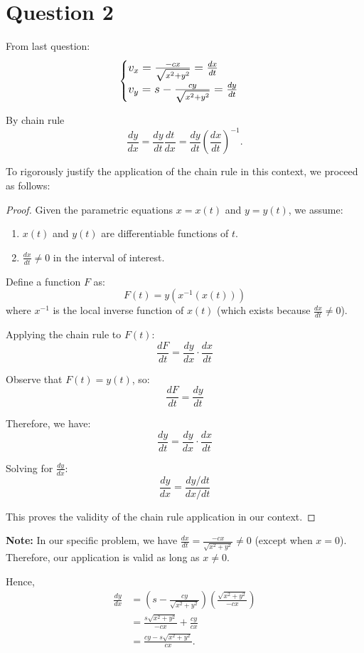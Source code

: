\documentclass[12pt,a4paper]{article}
\begin{document}
\section*{Question 2}
\begin{solution}
From last question:
\begin{equation}
    \large
    \begin{cases}
        {v}_x = \frac{-c x}{\sqrt{x^2+y^2}} = \frac{dx}{dt}\\
        {v}_y =  s-\frac{c y}{\sqrt{x^2+y^2}} = \frac{dy}{dt}
    \end{cases}
\end{equation}

By chain rule
\[
\frac{dy}{dx} = \frac{dy}{dt} \frac{dt}{dx} = \frac{dy}{dt} \left(\frac{dx}{dt}\right)^{-1}.
\]

\begin{remark}
To rigorously justify the application of the chain rule in this context, we proceed as follows:

\begin{proof}
Given the parametric equations $x = x(t)$ and $y = y(t)$, we assume:
\begin{enumerate}
    \item $x(t)$ and $y(t)$ are differentiable functions of $t$.
    \item $\frac{dx}{dt} \neq 0$ in the interval of interest.
\end{enumerate}

Define a function $F$ as:
\[
F(t) = y(x^{-1}(x(t)))
\]
where $x^{-1}$ is the local inverse function of $x(t)$ (which exists because $\frac{dx}{dt} \neq 0$).

Applying the chain rule to $F(t)$:
\[
\frac{dF}{dt} = \frac{dy}{dx} \cdot \frac{dx}{dt}
\]

Observe that $F(t) = y(t)$, so:
\[
\frac{dF}{dt} = \frac{dy}{dt}
\]

Therefore, we have:
\[
\frac{dy}{dt} = \frac{dy}{dx} \cdot \frac{dx}{dt}
\]

Solving for $\frac{dy}{dx}$:
\[
\frac{dy}{dx} = \frac{dy/dt}{dx/dt}
\]

This proves the validity of the chain rule application in our context.
\end{proof}

\textbf{Note:} In our specific problem, we have $\frac{dx}{dt} = \frac{-cx}{\sqrt{x^2+y^2}} \neq 0$ (except when $x = 0$). Therefore, our application is valid as long as $x \neq 0$.
\end{remark}

Hence,
\[
\begin{aligned}
    \frac{dy}{dx} &= \left( s-\frac{c y}{\sqrt{x^2+y^2}}\right)
    \left( \frac{\sqrt{x^2+y^2}}{-c x}\right)\\
    &=\frac{s\sqrt{x^2+y^2}}{-c x} + \frac{cy}{cx}\\
    &=\frac{cy-s\sqrt{x^2+y^2}}{cx}.
\end{aligned}
\]

\end{solution}
\end{document}
